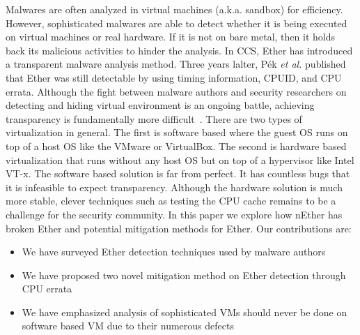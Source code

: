 Malwares are often analyzed in virtual machines (a.k.a. sandbox) for efficiency. However, sophisticated malwares are able to detect whether it is being executed on virtual machines or real hardware. If it is not on bare metal, then it holds back its malicious activities to hinder the analysis. In CCS, Ether \cite{ether} has introduced a transparent malware analysis method. Three years lalter, P{\'e}k \textit{et al.}\cite{nether} published that Ether\cite{ether} was still detectable by using timing information, CPUID, and CPU errata. Although the fight between malware authors and security researchers on detecting and hiding virtual environment is an ongoing battle, achieving transparency is fundamentally more difficult~\cite{garfinkel2007}.
There are two types of virtualization in general. The first is software based where the guest OS runs on top of a host OS like the VMware or VirtualBox. The second is hardware based virtualization that runs without any host OS but on top of a hypervisor like Intel VT-x. The software based solution is far from perfect. It has countless bugs that it is infeasible to expect transparency. Although the hardware solution is much more stable, clever techniques such as testing the CPU cache remains to be a challenge for the security community.
In this paper we explore how nEther\cite{nether} has broken Ether\cite{ether} and potential mitigation methods for Ether. Our contributions are:

\begin{itemize}
\item We have surveyed Ether\cite{ether} detection techniques used by malware authors
\item We have proposed two novel mitigation method on Ether detection through CPU errata
\item We have emphasized analysis of sophisticated VMs should never be done on software based VM due to their numerous defects 
\end{itemize}

